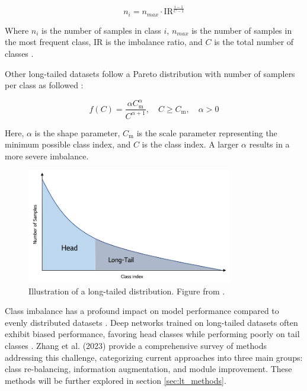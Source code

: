 \begin{equation}
    \label{eq:exp}
    n_i = n_{max}\cdot \text{IR}^{\frac{i-1}{C-1}}
\end{equation}

Where $n_i$ is the number of samples in class $i$, $n_{max}$ is the number of samples in the most frequent class, IR is the imbalance ratio, and $C$ is the total number of classes \cite{kaidic_ldam_drw}.

Other long-tailed datasets follow a Pareto distribution with number of samplers per class as followed \cite{liu2019largescalelongtailedrecognitionopen}:

\begin{equation}
    \label{eq:pareto}
    f(C) = \frac{\alpha C_{\text{m}}^\alpha}{C^{\alpha + 1}}, \quad C \geq C_{\text{m}}, \quad \alpha > 0
\end{equation}

Here, $\alpha$ is the shape parameter, $C_{\text{m}}$ is the scale parameter representing the minimum possible class index, and $C$ is the class index. A larger $\alpha$ results in a more severe imbalance.

\begin{figure}[ht]
    \centering
    \includegraphics[width=0.8\textwidth]{Images/long_tail_distribution.png} 
    \caption{Illustration of a long-tailed distribution. Figure from \cite{lgresearch257}.}
    \label{fig:lt_distribution} %
\end{figure}

Class imbalance has a profound impact on model performance compared to evenly distributed datasets \cite{vanhorn2017deviltailsfinegrainedclassification, cui2019classbalancedlossbasedeffective}. Deep networks trained on long-tailed datasets often exhibit biased performance, favoring head classes while performing poorly on tail classes \cite{zhang2023deep}. Zhang et al. (2023) provide a comprehensive survey of methods addressing this challenge, categorizing current approaches into three main groups: class re-balancing, information augmentation, and module improvement. These methods will be further explored in section \ref{sec:lt_methods}. 

